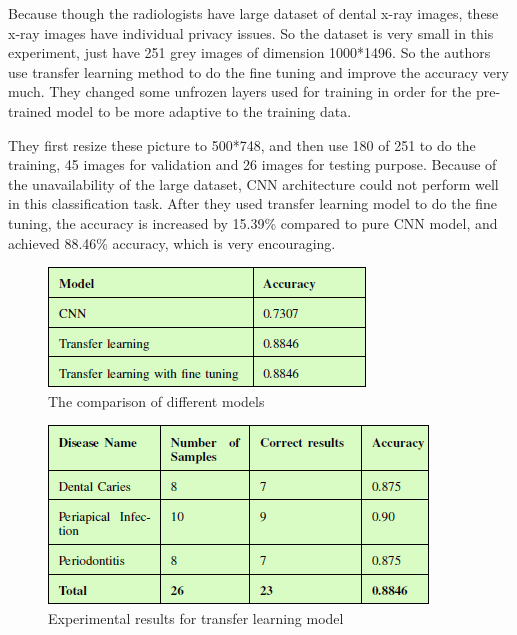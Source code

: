 \documentclass[10pt,twocolumn,letterpaper]{article}
\begin{document}
Because though the radiologists have large dataset of dental x-ray images, these x-ray images have individual privacy issues. So the dataset is very small in this experiment, just have 251 grey images of dimension 1000*1496. So the authors use transfer learning method to do the fine tuning and improve the accuracy very much. They changed some unfrozen layers used for training in order for the pre-trained model to be more adaptive to the training data.

They first resize these picture to 500*748, and then use 180 of 251 to do the training, 45 images for validation and 26 images for testing purpose. Because of the unavailability of the large dataset, CNN architecture could not perform well in this classification task. After they used transfer learning model to do the fine tuning, the accuracy is increased by 15.39\% compared to pure CNN model, and achieved 88.46\% accuracy, which is very encouraging.

\begin{figure}[t]
	\begin{center}
		\includegraphics[width=0.8\linewidth]{Pic/2.png}
	\end{center}
	\caption{The comparison of different models}
	\label{fig:long}
	\label{fig:onecol}
\end{figure}

\begin{figure}[t]
	\begin{center}
		\includegraphics[width=0.8\linewidth]{Pic/3.png}
	\end{center}
	\caption{Experimental results for transfer learning model}
	\label{fig:long}
	\label{fig:onecol}
\end{figure}
\end{document}
